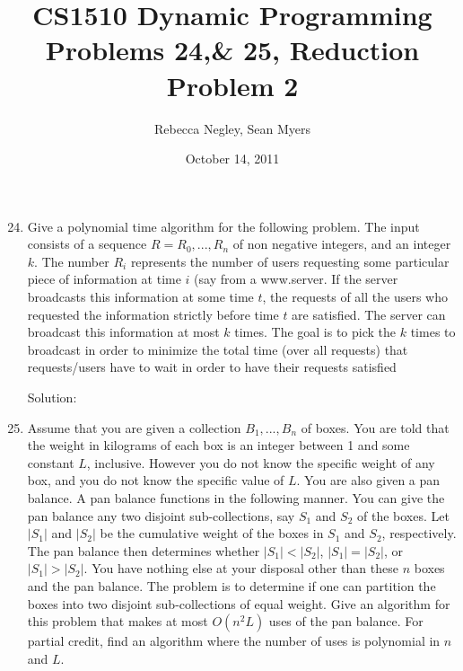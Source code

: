 \documentclass{article}
\title{CS1510  Dynamic Programming Problems 24,\& 25, Reduction Problem 2}
\author{Rebecca Negley, Sean Myers}
\date{October 14, 2011}
\begin{document}
\maketitle

\begin{enumerate}
\setcounter{enumi}{23}
\item Give a polynomial time algorithm for the following problem. The input consists of a sequence 
\newline$R = R_0, ..., R_n$ of non negative integers, and an integer $k$. The number $R_i$ represents the number of
\newline users requesting some particular piece of information at time $i$ (say from a www.server. If the
\newline server broadcasts this information at some time $t$, the requests of all the users who requested the
\newline information strictly before time $t$ are satisfied. The server can broadcast this information at most 
\newline $k$ times.  The goal is to pick the $k$ times to broadcast in order to minimize the total time (over all
\newline requests) that requests/users have to wait in order to have their requests satisfied

Solution:

\item Assume that you are given a collection $B_1,...,B_n$ of boxes. You are told that the weight in kilograms
\newline of each box is an integer between 1 and some constant $L$, inclusive. However you do not know the
\newline specific weight of any box, and you do not know the specific value of $L$. You are also given a pan 
\newline balance. A pan balance functions in the following manner. You can give the pan balance any two
\newline disjoint sub-collections, say $S_1$ and $S_2$ of the boxes. Let $|S_1|$ and $|S_2|$ be the cumulative weight of the 
\newline boxes in $S_1$ and $S_2$, respectively. The pan balance then determines whether $|S_1| < |S_2|$, $|S_1| = |S_2|$,
\newline or $|S_1| > |S_2|$. You have nothing else at your disposal other than these $n$ boxes and the pan balance. 
\newline The problem is to determine if one can partition the boxes into two disjoint sub-collections of equal
\newline weight. Give an algorithm for this problem that makes at most $O(n^2L)$ uses of the pan balance. For
\newline partial credit, find an algorithm where the number of uses is polynomial in $n$ and $L$.


\end{enumerate}
\end{document}
